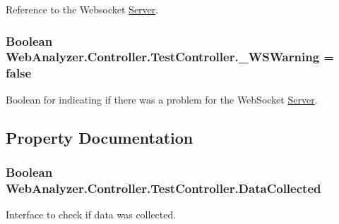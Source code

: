 Reference to the Websocket \hyperlink{namespace_web_analyzer_1_1_server}{Server}. 

\hypertarget{class_web_analyzer_1_1_controller_1_1_test_controller_a517bab0ee0c22871788bd498de86c27e}{}
\subsubsection[{\+\_\+\+W\+S\+Warning}]{\setlength{\rightskip}{0pt plus 5cm}Boolean Web\+Analyzer.\+Controller.\+Test\+Controller.\+\_\+\+W\+S\+Warning = {\bf false}\hspace{0.3cm}{\ttfamily [private]}}\label{class_web_analyzer_1_1_controller_1_1_test_controller_a517bab0ee0c22871788bd498de86c27e}


Boolean for indicating if there was a problem for the Web\+Socket \hyperlink{namespace_web_analyzer_1_1_server}{Server}. 



\subsection{Property Documentation}
\hypertarget{class_web_analyzer_1_1_controller_1_1_test_controller_a741cf98b95422a4a307bf8834db147b3}{}
\subsubsection[{Data\+Collected}]{\setlength{\rightskip}{0pt plus 5cm}Boolean Web\+Analyzer.\+Controller.\+Test\+Controller.\+Data\+Collected\hspace{0.3cm}{\ttfamily [get]}}\label{class_web_analyzer_1_1_controller_1_1_test_controller_a741cf98b95422a4a307bf8834db147b3}


Interface to check if data was collected. 

\hypertarget{class_web_analyzer_1_1_controller_1_1_test_controller_a3ec6bf7552cde054fdffaa8a1a6cf981}{}
